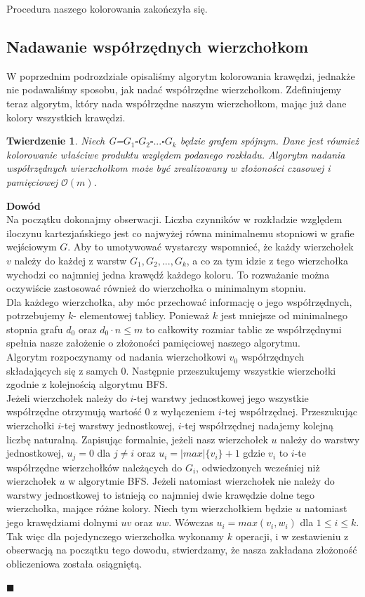 \documentclass[12pt,a4paper,titlepage]{article}
\newtheorem{twr}{Twierdzenie}
\newcommand\tab[1][1cm]{\hspace*{#1}}
\begin{document}
\tab[0.6cm]Procedura naszego kolorowania zakończyła się.
\subsection{Nadawanie współrzędnych wierzchołkom}
W poprzednim podrozdziale opisaliśmy algorytm kolorowania krawędzi, jednakże nie podawaliśmy sposobu, jak nadać współrzędne wierzchołkom. Zdefiniujemy teraz algorytm, który nada współrzędne naszym wierzchołkom, mając już dane kolory wszystkich krawędzi.\\

\begin{twr}Niech G=$G_1 \square G_2 \square ... \square G_k$ będzie grafem spójnym. Dane jest również kolorowanie właściwe produktu względem podanego rozkładu. Algorytm nadania współrzędnych wierzchołkom może być zrealizowany w złożoności czasowej i pamięciowej $\mathcal{O}(m)$.
\end{twr}
\tab[-0.6cm]\textbf{Dowód}\\
\tab[0.6cm]Na początku dokonajmy obserwacji. Liczba czynników w rozkładzie względem iloczynu kartezjańskiego jest co najwyżej równa minimalnemu stopniowi w grafie wejściowym $G$. Aby to umotywować wystarczy wspomnieć, że każdy wierzchołek $v$ należy do każdej z warstw $G_1, G_2, ..., G_k$, a co za tym idzie z tego wierzchołka wychodzi co najmniej jedna krawędź każdego koloru. To rozważanie można oczywiście zastosować również do wierzchołka o minimalnym stopniu.\\
\tab[0.6cm]Dla każdego wierzchołka, aby móc przechować informację o jego współrzędnych, potrzebujemy $k$- elementowej tablicy. Ponieważ $k$ jest mniejsze od minimalnego stopnia grafu $d_0$ oraz $d_0 \cdot n \leqslant m$ to całkowity rozmiar tablic ze współrzędnymi spełnia nasze założenie o złożoności pamięciowej naszego algorytmu.\\
\tab[0.6cm]Algorytm rozpoczynamy od nadania wierzchołkowi $v_0$ współrzędnych składających się z samych 0. Następnie przeszukujemy wszystkie wierzchołki zgodnie z kolejnością algorytmu BFS. \\
\tab[0.6cm]Jeżeli wierzchołek należy do $i$-tej warstwy jednostkowej jego wszystkie współrzędne otrzymują wartość 0 z wyłączeniem $i$-tej współrzędnej. Przeszukując wierzchołki $i$-tej warstwy jednostkowej, $i$-tej współrzędnej nadajemy kolejną liczbę naturalną. Zapisując formalnie, jeżeli nasz wierzchołek $u$ należy do warstwy jednostkowej, $u_j =0$ dla $j \neq i$
oraz $u_i = |max|\{v_i\}+1$ gdzie $v_i $ to $i$-te współrzędne wierzchołków należących do $G_i$, odwiedzonych wcześniej niż wierzchołek $u$ w algorytmie BFS. 
Jeżeli natomiast wierzchołek nie należy do warstwy jednostkowej to istnieją co najmniej dwie krawędzie dolne tego wierzchołka, mające różne kolory. Niech tym wierzchołkiem będzie $u$ natomiast jego krawędziami dolnymi $uv$ oraz $uw$. Wówczas $u_i = max(v_i , w_i )$ dla $1 \leqslant i \leqslant k$. Tak więc dla pojedynczego wierzchołka wykonamy $k$ operacji, i w zestawieniu z obserwacją na początku tego dowodu, stwierdzamy, że nasza zakładana złożoność obliczeniowa została osiągniętą.
\begin{flushright}
$\blacksquare$
\end{flushright}
\end{document}
